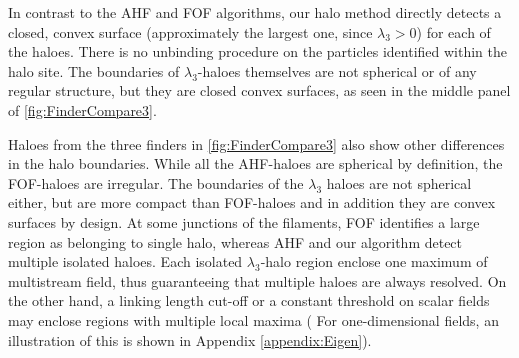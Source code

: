 In contrast to the AHF and FOF algorithms, our halo method directly detects a closed, convex surface (approximately the largest one, since $\lambda_3 >0$) for each of the haloes. There is no unbinding procedure on the particles identified within the halo site. The boundaries of $\lambda_3$-haloes themselves are not spherical or of any regular structure, but they are closed convex surfaces, as seen in the middle panel of \autoref{fig:FinderCompare3}. 



Haloes from the three finders in \autoref{fig:FinderCompare3} 
also show other differences in the halo boundaries. While all the AHF-haloes are spherical by definition, the FOF-haloes are irregular. The boundaries of the $\lambda_3$ haloes are not spherical either, but are more compact than FOF-haloes and in addition they are convex surfaces by design. At some junctions of the filaments, FOF identifies a large region as belonging to single halo, whereas AHF and our algorithm detect multiple isolated haloes. Each isolated $\lambda_3$-halo region enclose one maximum of multistream field, thus guaranteeing that multiple haloes are always resolved. On the other hand, a linking length cut-off or a constant threshold on scalar fields may enclose regions with multiple local maxima ( For one-dimensional fields, an illustration of this is shown in Appendix \ref{appendix:Eigen}). 
 
 
 

